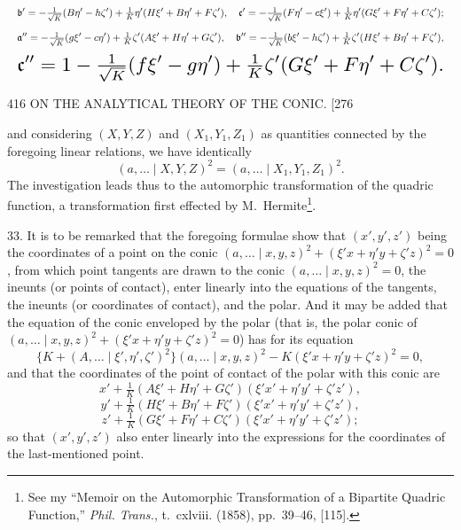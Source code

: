 \documentclass[11pt]{article}
\begin{document}
\[ \resizebox{\textwidth}{!}{$\displaystyle
\mathfrak{b}'=-\tfrac{1}{\sqrt{K}}(B\eta'-h\zeta')+\tfrac{1}{K}\eta'(H\xi'+B\eta'+F\zeta'),\quad
\mathfrak{c}'=-\tfrac{1}{\sqrt{K}}(F\eta'-c\xi')+\tfrac{1}{K}\eta'(G\xi'+F\eta'+C\zeta');$} \]
\[ \resizebox{\textwidth}{!}{$\displaystyle
\mathfrak{a}''=-\tfrac{1}{\sqrt{K}}(g\xi'-c\eta')+\tfrac{1}{K}\zeta'(A\xi'+H\eta'+G\zeta'),\quad
\mathfrak{b}''=-\tfrac{1}{\sqrt{K}}(b\xi'-h\zeta')+\tfrac{1}{K}\zeta'(H\xi'+B\eta'+F\zeta'),$} \]
\[ \resizebox{\textwidth}{!}{$\displaystyle
\mathfrak{c}''=1-\tfrac{1}{\sqrt{K}}(f\xi'-g\eta')+\tfrac{1}{K}\zeta'(G\xi'+F\eta'+C\zeta').$} \]

\begin{center}
416 \hfill ON THE ANALYTICAL THEORY OF THE CONIC. \hfill \textsc{[276}
\end{center}

and considering $(X,Y,Z)$ and $(X_{1},Y_{1},Z_{1})$ as quantities connected by the foregoing
linear relations, we have identically
\[ (a,\dots \mid X,Y,Z)^{2}=(a,\dots \mid X_{1},Y_{1},Z_{1})^{2}. \]
The investigation leads thus to the automorphic transformation of the quadric function,
a transformation first effected by M.~Hermite\footnote{See my ``Memoir on the Automorphic Transformation of a Bipartite Quadric Function,'' \textit{Phil. Trans.}, t.~cxlviii. (1858), pp.~39--46, [115].}.

\textsc{33.} It is to be remarked that the foregoing formulae show that $(x',y',z')$ being
the coordinates of a point on the conic $(a,\dots \mid x,y,z)^{2}+(\xi' x+\eta' y+\zeta' z)^{2}=0$, from which
point tangents are drawn to the conic $(a,\dots \mid x,y,z)^{2}=0$, the ineunts (or points of contact),
enter linearly into the equations of the tangents, the ineunts (or coordinates of contact),
and the polar. And it may be added that the equation of the conic enveloped by
the polar (that is, the polar conic of $(a,\dots \mid x,y,z)^{2}+(\xi' x+\eta' y+\zeta' z)^{2}=0$) has for its
equation
\[ \bigl\{K+(A,\dots \mid \xi',\eta',\zeta')^{2}\bigr\}(a,\dots \mid x,y,z)^{2}-K(\xi' x+\eta' y+\zeta' z)^{2}=0, \]
and that the coordinates of the point of contact of the polar with this conic are
\[ x'+\tfrac{1}{K}(A\xi'+H\eta'+G\zeta')(\xi' x'+\eta' y'+\zeta' z'), \]
\[ y'+\tfrac{1}{K}(H\xi'+B\eta'+F\zeta')(\xi' x'+\eta' y'+\zeta' z'), \]
\[ z'+\tfrac{1}{K}(G\xi'+F\eta'+C\zeta')(\xi' x'+\eta' y'+\zeta' z'); \]
so that $(x',y',z')$ also enter linearly into the expressions for the coordinates of the
last-mentioned point.
\end{document}
